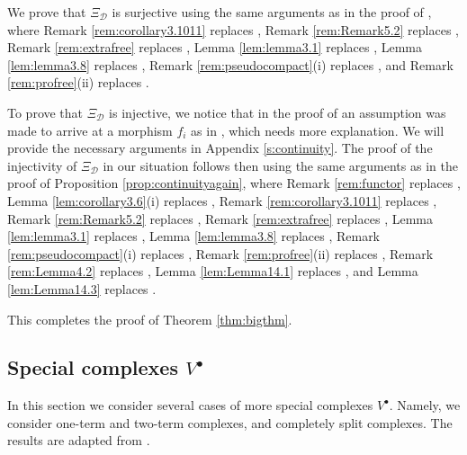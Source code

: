 \documentclass{amsart}
\theoremstyle{plain}
\theoremstyle{definition}
\theoremstyle{remark}
\begin{document}
We prove that $\Xi_{\mathcal{D}}$ is surjective using the same arguments as in the proof of 
\cite[Prop. 7.2]{bcderived}, where
Remark \ref{rem:corollary3.1011} replaces \cite[Cor. 3.11]{bcderived},
Remark \ref{rem:Remark5.2} replaces \cite[Remark 5.2]{bcderived},
Remark \ref{rem:extrafree} replaces \cite[Remark 2.3]{bcderived}, 
Lemma \ref{lem:lemma3.1} replaces \cite[Lemma 3.1]{bcderived}, 
Lemma \ref{lem:lemma3.8} replaces \cite[Lemma 3.8]{bcderived},
Remark \ref{rem:pseudocompact}(i) replaces \cite[Remark 2.2(i)]{bcderived}, and
Remark \ref{rem:profree}(ii) replaces \cite[Lemma 2.11]{bcderived}.

To prove that $\Xi_{\mathcal{D}}$ is injective, we notice that in the proof of 
\cite[Prop. 7.2]{bcderived} an assumption was made to arrive at a morphism 
$f_i$ as in \cite[Eq. (7.5)]{bcderived}, which needs more explanation. We will provide the
necessary arguments in Appendix \ref{s:continuity}. The proof of the injectivity
of $\Xi_{\mathcal{D}}$ in our situation follows then using the same arguments as in the proof of 
Proposition \ref{prop:continuityagain}, where
Remark \ref{rem:functor} replaces \cite[Prop. 2.12]{bcderived},
Lemma \ref{lem:corollary3.6}(i) replaces \cite[Corollary 3.6(i)]{bcderived},
Remark \ref{rem:corollary3.1011} replaces \cite[Cor. 3.11]{bcderived},
Remark \ref{rem:Remark5.2} replaces \cite[Remark 5.2]{bcderived},
Remark \ref{rem:extrafree} replaces \cite[Remark 2.3]{bcderived},
Lemma \ref{lem:lemma3.1} replaces \cite[Lemma 3.1]{bcderived},
Lemma \ref{lem:lemma3.8} replaces \cite[Lemma 3.8]{bcderived},
Remark \ref{rem:pseudocompact}(i) replaces \cite[Remark 2.2(i)]{bcderived},
Remark \ref{rem:profree}(ii) replaces \cite[Lemma 2.11]{bcderived}, 
Remark \ref{rem:Lemma4.2} replaces \cite[Lemma 4.2]{bcderived},
Lemma \ref{lem:Lemma14.1} replaces \cite[Lemma 14.1]{bcderived}, and
Lemma \ref{lem:Lemma14.3} replaces \cite[Lemma 14.3]{bcderived}.

\medskip

This completes the proof of Theorem \ref{thm:bigthm}.

\subsection{Special complexes $V^\bullet$}
\label{s:12terms}

In this section we consider several cases of more special complexes $V^\bullet$. Namely,
we consider one-term and two-term complexes, and completely split complexes.
The results are adapted from \cite[Sects. 9 and 11]{bcderived}. 
\end{document}
